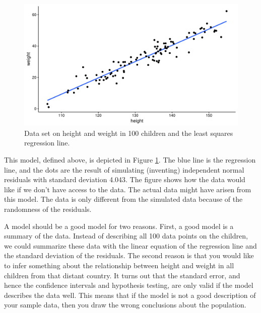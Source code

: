 \documentclass[]{book}\usepackage[]{graphicx}\usepackage[]{color}
\makeatletter
\def\maxwidth{ %
  \ifdim\Gin@nat@width>\linewidth
    \linewidth
  \else
    \Gin@nat@width
  \fi
}
\newenvironment{knitrout}{}{} %
\makeatother
\begin{document}
\begin{knitrout}
\color{fgcolor}\begin{figure}

{\centering \includegraphics[width=\maxwidth]{figure/ass_2-1} 

}

\caption[Data set on height and weight in 100 children and the least squares regression line]{Data set on height and weight in 100 children and the least squares regression line.}\label{fig:ass_2}
\end{figure}


\end{knitrout}


This model, defined above, is depicted in Figure \ref{fig:ass_2}. The blue line is the regression line, and the dots are the result of simulating (inventing) independent normal residuals with standard deviation 4.043. The figure shows how the data would like if we don't have access to the data. 
The actual data might have arisen from this model. The data is only different from the simulated data because of the randomness of the residuals. 

A model should be a good model for two reasons. First, a good model is a summary of the data. Instead of describing all 100 data points on the children, we could summarize these data with the linear equation of the regression line and the standard deviation of the residuals. The second reason is that you would like to infer something about the relationship between height and weight in all children from that distant country. It turns out that the standard error, and hence the confidence intervals  and hypothesis testing, are only valid if the model describes the data well. This means that if the model is not a good description of your sample data, then you draw the wrong conclusions about the population.
\end{document}
